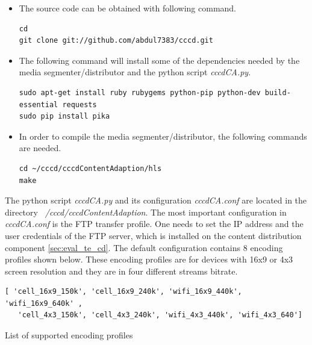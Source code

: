 \begin{itemize}

\item The source code can be obtained with following command.

\begin{code}
\begin{verbatim}
cd
git clone git://github.com/abdul7383/cccd.git
\end{verbatim}
\end{code}

\item The following command will install some of the dependencies needed by the media segmenter/distributor and the python script \textit{cccdCA.py}.

\begin{code}
\begin{verbatim}
sudo apt-get install ruby rubygems python-pip python-dev build-essential requests
sudo pip install pika
\end{verbatim}
\end{code}

\item In order to compile the media segmenter/distributor, the following commands are needed.

\begin{code}
\begin{verbatim}
cd ~/cccd/cccdContentAdaption/hls
make
\end{verbatim}
\end{code}

\end{itemize} 

The python script \textit{cccdCA.py} and its configuration \textit{cccdCA.conf} are located in the directory \textit{~/cccd/cccdContentAdaption}. The most important configuration in \textit{ cccdCA.conf}  is the FTP transfer profile. One needs to set the IP address and the user credentials of the FTP server, which is installed on the content distribution component \ref{sec:eval_te_cd}. The default configuration contains 8 encoding profiles shown below. These encoding profiles are for devices with 16x9 or 4x3 screen resolution and they are in four different streams bitrate.

\begin{code}
\begin{verbatim}
[ 'cell_16x9_150k', 'cell_16x9_240k', 'wifi_16x9_440k', 'wifi_16x9_640k' ,
   'cell_4x3_150k', 'cell_4x3_240k', 'wifi_4x3_440k', 'wifi_4x3_640']
\end{verbatim}
\caption{List of supported encoding profiles}
\label{lst:encoding_profiles}
\end{code}

